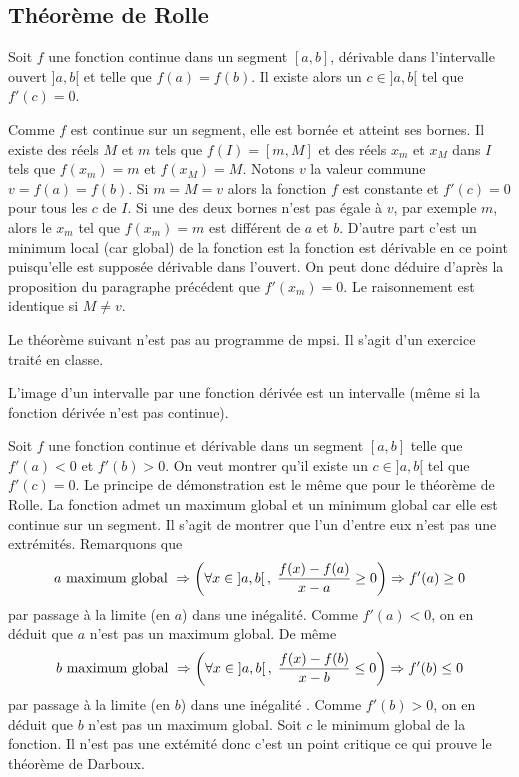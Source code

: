 \subsection{Théorème de Rolle}
\begin{thm}
 Soit $f$ une fonction continue dans un segment $[a,b]$, dérivable dans l'intervalle ouvert $]a,b[$ et telle que $f(a)=f(b)$. Il existe alors un $c\in]a,b[$ tel que $f'(c)=0$.
\end{thm}
\begin{demo}
Comme $f$ est continue sur un segment, elle est bornée et atteint ses bornes. Il existe des réels $M$ et $m$ tels que $f(I)=[m,M]$ et des réels $x_m$ et $x_M$ dans $I$ tels que $f(x_m)=m$ et $f(x_M)=M$.\newline
Notons $v$ la valeur commune $v=f(a)=f(b)$. Si $m=M=v$ alors la fonction $f$ est constante et $f'(c)=0$ pour tous les $c$ de $I$.\newline
Si une des deux bornes n'est pas égale à $v$, par exemple $m$, alors le $x_m$ tel que $f(x_m)=m$ est différent de $a$ et $b$. D'autre part c'est un minimum local (car global) de la fonction est la fonction est dérivable en ce point puisqu'elle est supposée dérivable dans l'ouvert. On peut donc déduire d'après la proposition du paragraphe précédent que $f'(x_m)=0$. Le raisonnement est identique si $M\neq v$.
\end{demo}

Le théorème suivant n'est pas au programme de mpsi. Il s'agit d'un exercice traité en classe.
\begin{prop}
L'image d'un intervalle par une fonction dérivée est un intervalle (même si la fonction dérivée n'est pas continue). 
\end{prop}
\begin{demo}
Soit $f$ une fonction continue et dérivable dans un segment $[a,b]$ telle que $f'(a)<0$ et $f'(b)>0$. On veut montrer qu'il existe un $c\in]a,b[$ tel que $f'(c)=0$.\newline
Le principe de démonstration est le même que pour le théorème de Rolle. La fonction admet un maximum global et un minimum global car elle est continue sur un segment. Il s'agit de montrer que l'un d'entre eux n'est pas une extrémités.\newline 
Remarquons que 
 \[
  a \text{ maximum global } \Rightarrow \left( \forall x \in \left] a , b \right[, \; \frac{f(x) - f(a)}{x-a} \geq 0\right) \Rightarrow f'(a) \geq 0
 \]
par passage à la limite (en $a$) dans une inégalité. Comme $f'(a) < 0$, on en déduit que $a$ n'est pas un maximum global.\newline
De même 
 \[
  b \text{ maximum global } \Rightarrow \left( \forall x \in \left] a , b \right[, \; \frac{f(x) - f(b)}{x-b} \leq 0\right) \Rightarrow f'(b) \leq 0
 \]
par passage à la limite (en $b$) dans une inégalité . Comme $f'(b) > 0$, on en déduit que $b$ n'est pas un maximum global.\newline
Soit $c$ le minimum global de la fonction. Il n'est pas une extémité donc c'est un point critique ce qui prouve le théorème de Darboux.

\end{demo}


